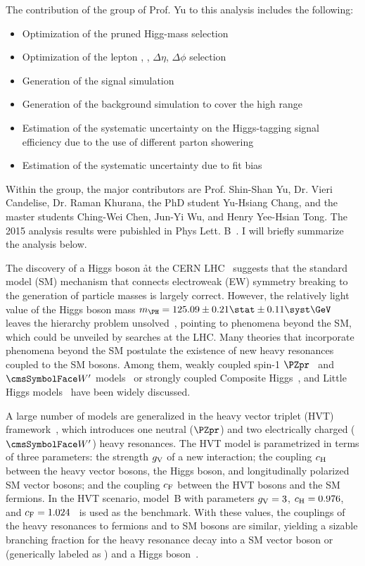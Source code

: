 The contribution of the group of Prof. Yu to this analysis includes the following:
\begin{itemize}
\item Optimization of the pruned Higg-mass selection
\item Optimization of the lepton \pt, \eta, $\Delta \eta$, $\Delta \phi$ selection
\item Generation of the signal simulation
\item Generation of the background simulation to cover the high \pt range
\item Estimation of the systematic uncertainty on the Higgs-tagging signal efficiency due to the use of different parton showering
\item Estimation of the systematic uncertainty due to fit bias
\end{itemize}
Within the group, the major contributors are Prof. Shin-Shan Yu, Dr. Vieri Candelise, Dr. Raman Khurana, the PhD student Yu-Hsiang Chang, and the master students Ching-Wei Chen, Jun-Yi Wu, and Henry Yee-Hsian Tong. The 2015 analysis results were pubishled in Phys Lett. B~\cite{Khachatryan:2016cfx}. I will briefly summarize the analysis below.

The discovery of a Higgs boson \h at the CERN LHC~\cite{bib:Aad20121,bib:Chatrchyan201230,Chatrchyan:2013lba} suggests that the standard 
model (SM) mechanism that connects electroweak (EW) symmetry breaking to the generation of particle masses is largely correct.
However, the relatively light value of the Higgs boson mass 
$\mH = 125.09 \pm 0.21\stat \pm 0.11\syst\GeV$~\cite{Aad:2014aba,Khachatryan:2014jba,Chatrchyan:2014vua,Aad:2015zhl} leaves the hierarchy 
problem unsolved~\cite{1988NuPhB}, pointing to phenomena beyond the SM, which could be unveiled by searches at the LHC.
Many theories that incorporate phenomena beyond the SM postulate the existence of new heavy resonances coupled to the SM bosons. 
Among them, weakly coupled spin-1 $\PZpr$~\cite{Barger:1980ix,1126-6708-2009-11-068} and $\PW'$ models~\cite{Grojean:2011vu} or strongly 
coupled Composite Higgs~\cite{Contino2011,Marzocca2012,Bellazzini:2014yua}, and 
Little Higgs models~\cite{Han:2003wu,Schmaltz,Perelstein2007247} have been widely discussed.

A large number of models are generalized in the heavy vector triplet (HVT) framework~\cite{Pappadopulo2014}, which introduces one neutral 
($\PZpr$) and two electrically charged ($\PW'$) heavy resonances. The HVT model is parametrized in terms of three parameters: the strength 
$g_\text{V}$ of a new interaction; the coupling $c_\text{H}$ between the heavy vector bosons, the Higgs boson, and longitudinally polarized SM vector 
bosons; and the coupling $c_\text{F}$ between the HVT bosons and the SM fermions.
In the HVT scenario, model~B with parameters $g_\text{V} = 3$, $c_\text{H} = 0.976$, and $c_\text{F} = 1.024$~\cite{Pappadopulo2014} is used as the benchmark. 
With these values, the couplings of the heavy resonances to fermions and to SM bosons are similar, yielding a sizable branching fraction 
for the heavy resonance decay into a SM vector boson \PW or \Z (generically labeled as \V) and a Higgs boson~\cite{Pappadopulo2014}.

